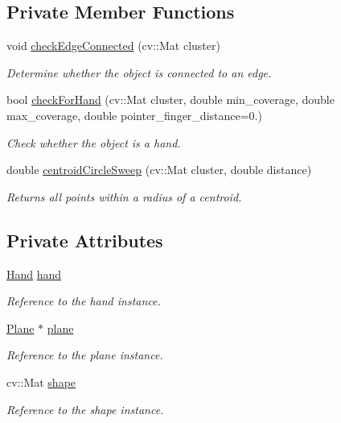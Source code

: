 \subsection*{Private Member Functions}
\begin{DoxyCompactItemize}
\item 
void \hyperlink{class_object3_d_a9da221ef5e29107d54f0ee050ee267d3}{check\+Edge\+Connected} (cv\+::\+Mat cluster)
\begin{DoxyCompactList}\small\item\em Determine whether the object is connected to an edge. \end{DoxyCompactList}\item 
bool \hyperlink{class_object3_d_aab68a054bf5f5e0498c7b5cd0fc54bfa}{check\+For\+Hand} (cv\+::\+Mat cluster, double min\+\_\+coverage, double max\+\_\+coverage, double pointer\+\_\+finger\+\_\+distance=0.)
\begin{DoxyCompactList}\small\item\em Check whether the object is a hand. \end{DoxyCompactList}\item 
double \hyperlink{class_object3_d_abc610dabb1f32b90702ff2418bd949b3}{centroid\+Circle\+Sweep} (cv\+::\+Mat cluster, double distance)
\begin{DoxyCompactList}\small\item\em Returns all points within a radius of a centroid. \end{DoxyCompactList}\end{DoxyCompactItemize}
\subsection*{Private Attributes}
\begin{DoxyCompactItemize}
\item 
\hyperlink{class_hand}{Hand} \hyperlink{class_object3_d_abb8332580980c9ed85c43faf1f25cb0f}{hand}
\begin{DoxyCompactList}\small\item\em Reference to the hand instance. \end{DoxyCompactList}\item 
\hyperlink{class_plane}{Plane} $\ast$ \hyperlink{class_object3_d_a0fef984a1f54d349271c474a08ebfd6d}{plane}
\begin{DoxyCompactList}\small\item\em Reference to the plane instance. \end{DoxyCompactList}\item 
cv\+::\+Mat \hyperlink{class_object3_d_a27de2794f028136d15a4073e830980d1}{shape}
\begin{DoxyCompactList}\small\item\em Reference to the shape instance. \end{DoxyCompactList}\end{DoxyCompactItemize}


